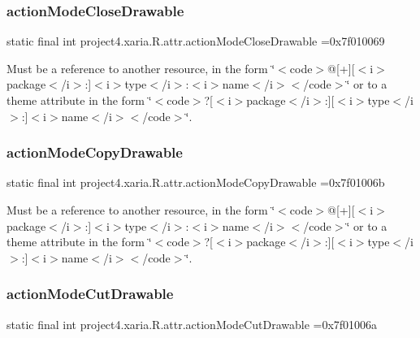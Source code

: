 \subsubsection{\texorpdfstring{action\+Mode\+Close\+Drawable}{actionModeCloseDrawable}}
{\footnotesize\ttfamily static final int project4.\+xaria.\+R.\+attr.\+action\+Mode\+Close\+Drawable =0x7f010069\hspace{0.3cm}{\ttfamily [static]}}

Must be a reference to another resource, in the form \char`\"{}$<$code$>$@\mbox{[}+\mbox{]}\mbox{[}$<$i$>$package$<$/i$>$\+:\mbox{]}$<$i$>$type$<$/i$>$\+:$<$i$>$name$<$/i$>$$<$/code$>$\char`\"{} or to a theme attribute in the form \char`\"{}$<$code$>$?\mbox{[}$<$i$>$package$<$/i$>$\+:\mbox{]}\mbox{[}$<$i$>$type$<$/i$>$\+:\mbox{]}$<$i$>$name$<$/i$>$$<$/code$>$\char`\"{}. \mbox{\label{classproject4_1_1xaria_1_1R_1_1attr_a46e49dce7936260f23268beb416e989b}} 
\subsubsection{\texorpdfstring{action\+Mode\+Copy\+Drawable}{actionModeCopyDrawable}}
{\footnotesize\ttfamily static final int project4.\+xaria.\+R.\+attr.\+action\+Mode\+Copy\+Drawable =0x7f01006b\hspace{0.3cm}{\ttfamily [static]}}

Must be a reference to another resource, in the form \char`\"{}$<$code$>$@\mbox{[}+\mbox{]}\mbox{[}$<$i$>$package$<$/i$>$\+:\mbox{]}$<$i$>$type$<$/i$>$\+:$<$i$>$name$<$/i$>$$<$/code$>$\char`\"{} or to a theme attribute in the form \char`\"{}$<$code$>$?\mbox{[}$<$i$>$package$<$/i$>$\+:\mbox{]}\mbox{[}$<$i$>$type$<$/i$>$\+:\mbox{]}$<$i$>$name$<$/i$>$$<$/code$>$\char`\"{}. \mbox{\label{classproject4_1_1xaria_1_1R_1_1attr_a99bc008fe40749347ad6adbb1b62f2f7}} 
\subsubsection{\texorpdfstring{action\+Mode\+Cut\+Drawable}{actionModeCutDrawable}}
{\footnotesize\ttfamily static final int project4.\+xaria.\+R.\+attr.\+action\+Mode\+Cut\+Drawable =0x7f01006a\hspace{0.3cm}{\ttfamily [static]}}

